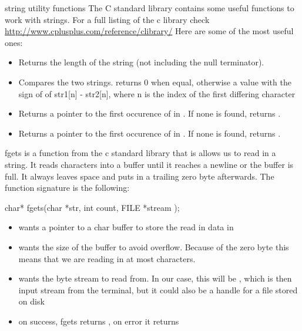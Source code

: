 \documentclass[10pt,graphics,aspectratio=169,table]{beamer}
\begin{document}
\begin{frame}[fragile]{string utility functions}
    The C standard library contains some useful functions to work with strings.
    For a full listing of the c library check
    \url{http://www.cplusplus.com/reference/clibrary/}
    Here are some of the most useful ones:
    \begin{itemize}
        \item {}
    
        Returns the length of the string (not including the null terminator).
    
        \item {}
        
        Compares the two strings. returns 0 when equal, otherwise 
        a value with the sign of of str1[n] - str2[n], where n is the index 
        of the first differing character 
        
        \item {}
        
        Returns a pointer to the first occurence of  in .
        If none is found, returns .

        \item {}
        
        Returns a pointer to the first occurence of  in .
        If none is found, returns .
    \end{itemize}
 
\end{frame}


\begin{frame}[fragile]{fgets}
     is a function from the c standard library that is 
    allows us to read in a string. It reads characters into a buffer
    until it reaches a newline or the buffer is full. It always leaves space
    and puts in a trailing zero byte afterwards.
    The function signature is the following:
    \begin{codeblock}[numbers=none]
char* fgets(char *str, int count, FILE *stream );
    \end{codeblock}
    \begin{itemize}
        \item {} wants a pointer to a char buffer to 
            store the read in data in
        \item {} wants the size of the 
            buffer to avoid overflow. Because of the zero byte this means 
            that we are reading in at most  characters.
        \item {} wants the byte stream to read from. In our case, this
            will be , which is then input stream from the terminal,
            but it could also be a handle for a file stored on disk 
        \item on success, fgets returns , on error it returns 
    \end{itemize}
\end{frame}
\end{document}
